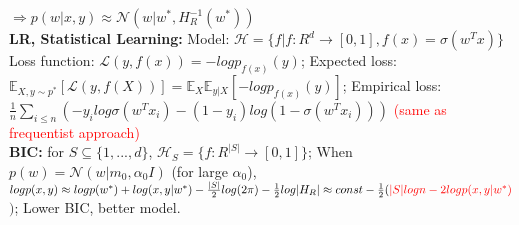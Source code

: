 $\Rightarrow p(w | x, y) \approx \mathcal{N}(w | w^*, H_R^{-1}(w^*))$
\\
\textbf{LR, Statistical Learning: } 
Model: $\mathcal{H} = \{f | f: R^d \rightarrow [0, 1], f(x) = \sigma(w^Tx)\}$ \\
Loss function:  $\mathcal{L}(y, f(x)) = -logp_{f(x)}(y)$; Expected loss: $\mathbb{E}_{X, y \sim p^*}[\mathcal{L}(y, f(X))] = \mathbb{E}_X\mathbb{E}_{y|X}[-logp_{f(x)}(y)]$; Empirical loss: $\frac{1}{n} \sum_{i \leq n} (-y_i log\sigma (w^Tx_i) - (1 - y_i) log(1 - \sigma(w^T x_i)))$ \textcolor{red}{(same as frequentist approach)}
\\
\textbf{BIC: } 
for $S \subseteq \{1, ..., d\}$, $\mathcal{H}_S = \{f: R^{|S|} \rightarrow [0, 1] \}$; When $p(w) = \mathcal{N}(w | m_0, \alpha_0 I)$ (for large $\alpha_0$), $log p(x, y) \approx log p(w^*) + log(x, y | w^*) - \frac{|S|}{2} log(2\pi) - \frac{1}{2} log |H_R| \approx const - \frac{1}{2}(\color{red}{|S| log n - 2 log p(x, y | w^*)}$$)$; Lower BIC, better model.
